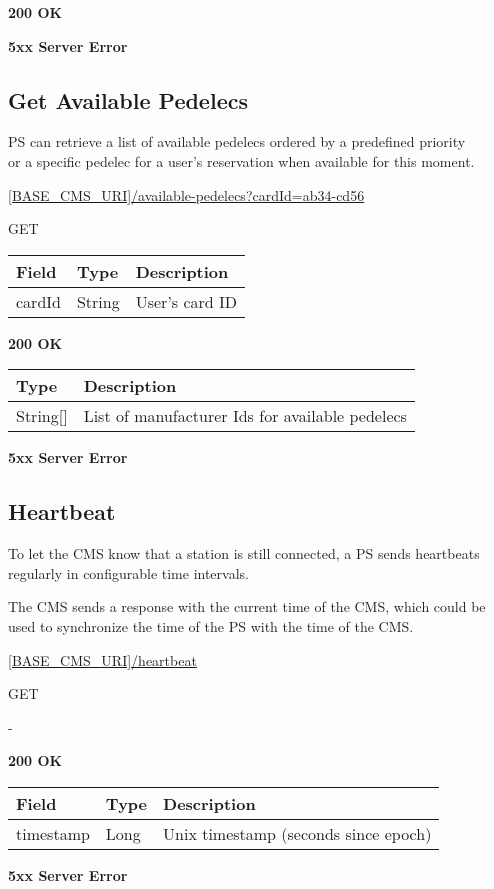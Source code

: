  \textbf{200 OK}

 \textbf{5xx Server Error}

\subsection{Get Available Pedelecs}

\acs{PS} can retrieve a list of available pedelecs ordered by a predefined priority\\ or a specific pedelec for a user's reservation when available for this moment.

 \url{[BASE_CMS_URI]/available-pedelecs?cardId=ab34-cd56}

 GET

\begin{table}[!h]
\vspace{-7mm}
\begin{tabularx}{\linewidth}{ | l | l | X | }
  \hline
  \rowcolor{table-head}
  Field & Type & Description \\
  \hline
  	cardId & String & User's card ID\\
    \hline
\end{tabularx}
\end{table}


 \textbf{200 OK}

\begin{tabularx}{\linewidth}{ | l | X | }
  \hline
  \rowcolor{table-head}
  Type & Description \\
  \hline
  	String[] & List of manufacturer Ids for available pedelecs \\	
  \hline
\end{tabularx}

 \textbf{5xx Server Error}

\subsection{Heartbeat}

To let the \acs{CMS} know that a station is still connected, a \acs{PS} sends heartbeats regularly in configurable time intervals.

The \acs{CMS} sends a response with the current time of the \acs{CMS}, which could be used to synchronize the time of the \acs{PS} with the time of the \acs{CMS}.

 \url{[BASE_CMS_URI]/heartbeat}

 GET

 -

 \textbf{200 OK}

\begin{tabularx}{\linewidth}{ | l | l | X | }
  \hline
  \rowcolor{table-head}
  Field & Type & Description \\
  \hline
  	timestamp & Long			& Unix timestamp (seconds since epoch) \\	
  \hline
\end{tabularx}


 \textbf{5xx Server Error}
